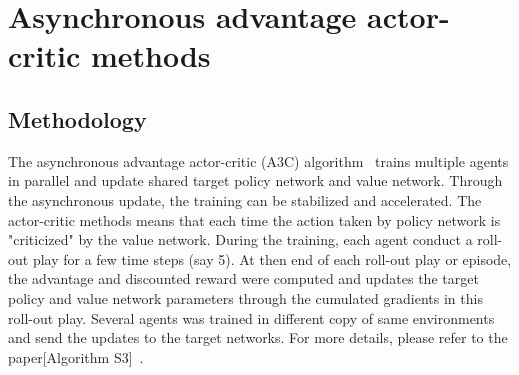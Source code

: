 
\section{Asynchronous advantage actor-critic methods}
\subsection{Methodology}
The asynchronous advantage actor-critic (A3C) algorithm~\cite{mnih2016asynchronous}
 trains multiple agents in parallel and update shared
target policy network and value network. 
Through the asynchronous update, the training can be stabilized 
and accelerated. The actor-critic methods means that each time
the action taken by policy network is "criticized"
by the value network. During the training, each agent conduct a 
roll-out play for a few time steps (say 5). At then end of each 
roll-out play or episode, the advantage and discounted reward were
computed and updates the target policy and value network parameters
through the cumulated gradients in this roll-out play. Several agents
was trained in different copy of same environments and send the updates
to the target networks. For more details, please refer to the paper[Algorithm S3]~\cite{mnih2016asynchronous}.
